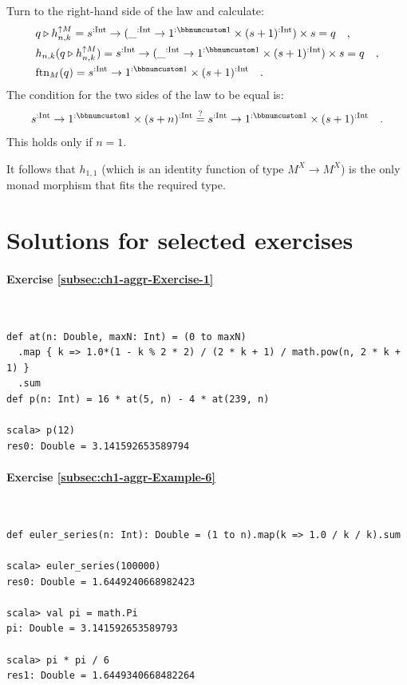 Turn to the right-hand side of the law and calculate:
\begin{align*}
 & q\triangleright h_{n,k}^{\uparrow M}=s^{:\text{Int}}\rightarrow(\_^{:\text{Int}}\rightarrow1^{:\bbnum 1}\times(s+1)^{:\text{Int}})\times s=q\quad,\\
 & h_{n,k}(q\triangleright h_{n,k}^{\uparrow M})=s^{:\text{Int}}\rightarrow(\_^{:\text{Int}}\rightarrow1^{:\bbnum 1}\times(s+1)^{:\text{Int}})\times s=q\quad,\\
 & \text{ftn}_{M}(q)=s^{:\text{Int}}\rightarrow1^{:\bbnum 1}\times(s+1)^{:\text{Int}}\quad.
\end{align*}
The condition for the two sides of the law to be equal is:
\[
s^{:\text{Int}}\rightarrow1^{:\bbnum 1}\times(s+n)^{:\text{Int}}\overset{?}{=}s^{:\text{Int}}\rightarrow1^{:\bbnum 1}\times(s+1)^{:\text{Int}}\quad.
\]
This holds only if $n=1$.

It follows that $h_{1,1}$ (which is an identity function of type
$M^{X}\rightarrow M^{X}$) is the only monad morphism that fits the
required type. 

\chapter{Solutions for selected exercises}


\subsubsection*{Exercise \ref{subsec:ch1-aggr-Exercise-1}}

~
\begin{lstlisting}
def at(n: Double, maxN: Int) = (0 to maxN)
  .map { k => 1.0*(1 - k % 2 * 2) / (2 * k + 1) / math.pow(n, 2 * k + 1) }
  .sum
def p(n: Int) = 16 * at(5, n) - 4 * at(239, n)

scala> p(12)
res0: Double = 3.141592653589794
\end{lstlisting}


\subsubsection*{Exercise \ref{subsec:ch1-aggr-Example-6}}

~

\begin{lstlisting}
def euler_series(n: Int): Double = (1 to n).map(k => 1.0 / k / k).sum

scala> euler_series(100000)
res0: Double = 1.6449240668982423

scala> val pi = math.Pi
pi: Double = 3.141592653589793

scala> pi * pi / 6
res1: Double = 1.6449340668482264 
\end{lstlisting}


